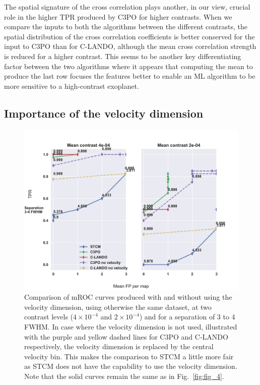 \documentclass{aa}
\begin{document}
The spatial signature of the cross correlation plays another, in our view, crucial role in the higher TPR produced by C3PO for higher contrasts.
When we compare the inputs to both the algorithms between the different contrasts, the spatial distribution of the cross correlation coefficients is better conserved for the input to C3PO than for C-LANDO, although the mean cross correlation strength is reduced for a higher contrast.
This seems to be another key differentiating factor between the two algorithms where it appears that computing the mean to produce the last row focuses the features better to enable an ML algorithm to be more sensitive to a high-contrast exoplanet.

\subsection{Importance of the velocity dimension}

\begin{figure}
    \centering
    \includegraphics[width=\textwidth]{Fig6_final_September.png}
    \caption{Comparison of mROC curves produced with and without using the velocity dimension, using otherwise the same dataset, at two contrast levels ($4\times 10^{-4}$ and $2\times 10^{-4}$) and for a separation of 3 to 4 FWHM. In case where the velocity dimension is not used, illustrated with the purple and yellow dashed lines for C3PO and C-LANDO respectively, the velocity dimension is replaced by the central velocity bin. This makes the comparison to STCM a little more fair as STCM does not have the capability to use the velocity dimension.
    Note that the solid curves remain the same as in Fig.~\ref{fig:fig_4}.
    }
    \label{fig:novel_roc}
\end{figure}
\end{document}
